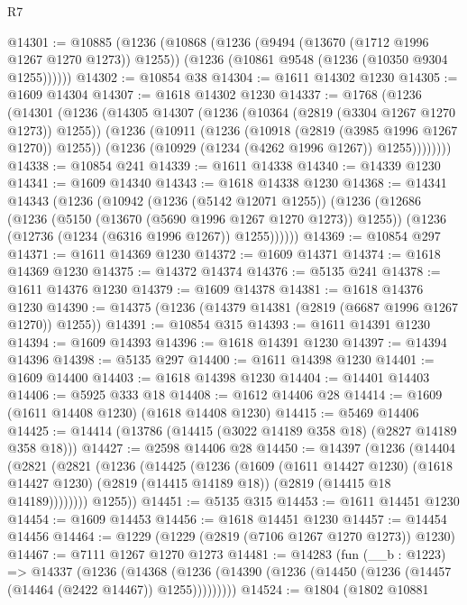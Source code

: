 \begin{lexlean}{R7}
\begin{coremodule}
@14301 := @10885
    (@1236
      (@10868
        (@1236 (@9494 (@13670 (@1712 @1996 @1267 @1270 @1273)) @1255))
        (@1236 (@10861 @9548 (@1236 (@10350 @9304 @1255))))))
@14302 := @10854 @38
@14304 := @1611 @14302 @1230
@14305 := @1609 @14304
@14307 := @1618 @14302 @1230
@14337 := @1768
    (@1236
      (@14301
        (@1236
          (@14305
            @14307
            (@1236 (@10364 (@2819 (@3304 @1267 @1270 @1273)) @1255))
            (@1236
              (@10911
                (@1236 (@10918 (@2819 (@3985 @1996 @1267 @1270)) @1255))
                (@1236 (@10929 (@1234 (@4262 @1996 @1267)) @1255))))))))
@14338 := @10854 @241
@14339 := @1611 @14338
@14340 := @14339 @1230
@14341 := @1609 @14340
@14343 := @1618 @14338 @1230
@14368 := @14341
    @14343
    (@1236
      (@10942
        (@1236 (@5142 @12071 @1255))
        (@1236
          (@12686
            (@1236 (@5150 (@13670 (@5690 @1996 @1267 @1270 @1273)) @1255))
            (@1236 (@12736 (@1234 (@6316 @1996 @1267)) @1255))))))
@14369 := @10854 @297
@14371 := @1611 @14369 @1230
@14372 := @1609 @14371
@14374 := @1618 @14369 @1230
@14375 := @14372 @14374
@14376 := @5135 @241
@14378 := @1611 @14376 @1230
@14379 := @1609 @14378
@14381 := @1618 @14376 @1230
@14390 := @14375 (@1236 (@14379 @14381 (@2819 (@6687 @1996 @1267 @1270)) @1255))
@14391 := @10854 @315
@14393 := @1611 @14391 @1230
@14394 := @1609 @14393
@14396 := @1618 @14391 @1230
@14397 := @14394 @14396
@14398 := @5135 @297
@14400 := @1611 @14398 @1230
@14401 := @1609 @14400
@14403 := @1618 @14398 @1230
@14404 := @14401 @14403
@14406 := @5925 @333 @18
@14408 := @1612 @14406 @28
@14414 := @1609 (@1611 @14408 @1230) (@1618 @14408 @1230)
@14415 := @5469 @14406
@14425 := @14414 (@13786 (@14415 (@3022 @14189 @358 @18) (@2827 @14189 @358 @18)))
@14427 := @2598 @14406 @28
@14450 := @14397
    (@1236
      (@14404
        (@2821
          (@2821
            (@1236
              (@14425
                (@1236
                  (@1609
                    (@1611 @14427 @1230)
                    (@1618 @14427 @1230)
                    (@2819 (@14415 @14189 @18))
                    (@2819 (@14415 @18 @14189))))))))
        @1255))
@14451 := @5135 @315
@14453 := @1611 @14451 @1230
@14454 := @1609 @14453
@14456 := @1618 @14451 @1230
@14457 := @14454 @14456
@14464 := @1229 (@1229 (@2819 (@7106 @1267 @1270 @1273)) @1230)
@14467 := @7111 @1267 @1270 @1273
@14481 := @14283
    (fun (__b : @1223) =>
    @14337
      (@1236
        (@14368 (@1236 (@14390 (@1236 (@14450 (@1236 (@14457 (@14464 (@2422 @14467)) @1255)))))))))
@14524 := @1804
    (@1802
      @10881

\end{coremodule}
\end{lexlean}

